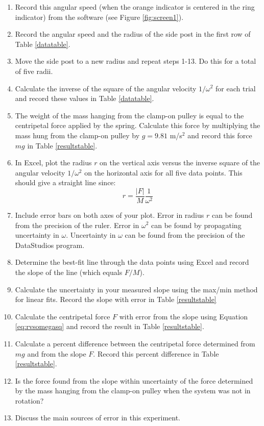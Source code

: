 \begin{enumerate}
	\item Record this angular speed (when the orange indicator is centered in the ring indicator) from the software (see Figure \ref{fig:screen1}). 
	\item Record the angular speed and the radius of the side post in the first row of Table \ref{datatable}.
	\item Move the side post to a new radius and repeat steps 1-13. Do this for a total of five radii.
	\item Calculate the inverse of the square of the angular velocity $1/\omega^2$ for each trial and record these values in Table \ref{datatable}.
	\item The weight of the mass hanging from the clamp-on pulley is equal to the centripetal force applied by the spring. Calculate this force by multiplying the mass hung from the clamp-on pulley by $g = 9.81$ m/s$^{2}$ and record this force $mg$ in Table \ref{resultstable}.	
	\item In Excel, plot the radius $r$ on the vertical axis versus the inverse square of the angular velocity $1/\omega^2$ on the horizontal axis for all five data points. This should give a straight line since:
	\begin{equation}
		r = \frac{|F|}{M}\frac{1}{\omega^2}
	\label{eq:rvsomegasq}
	\end{equation}
	\item Include error bars on both axes of your plot. Error in radius $r$ can be found from the precision of the ruler. Error in $\omega^2$ can be found by propagating uncertainty in $\omega$. Uncertainty in $\omega$ can be found from the precision of the DataStudios program.
	\item Determine the best-fit line through the data points using Excel and record the slope of the line (which equals $F/M$).
	\item Calculate the uncertainty in your measured slope using the max/min method for linear fits. Record the slope with error in Table \ref{resultstable} 
	\item Calculate the centripetal force $F$ with error from the slope using Equation \ref{eq:rvsomegasq}
 and record the result in Table \ref{resultstable}.
	\item Calculate a percent difference between the centripetal force determined from $mg$ and from the slope $F$.  Record this percent difference in Table \ref{resultstable}.
	\item Is the force found from the slope within uncertainty of the force determined by the mass hanging from the clamp-on pulley when the system was not in rotation?  
	\item Discuss the main sources of error in this experiment.
\end{enumerate}


